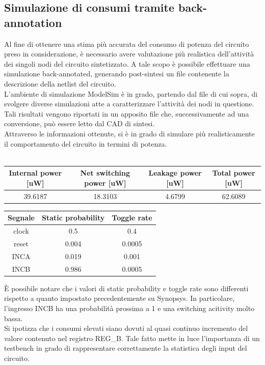 \documentclass[11pt,  english, makeidx, a4paper, titlepage, oneside]{book}
\begin{document}
\subsection{Simulazione di consumi tramite back-annotation}
Al fine di ottenere una stima più accurata del consumo di potenza del circuito preso in considerazione, è necessario avere valutazione più realistica dell'attività dei singoli nodi del circuito sintetizzato. A tale scopo è possibile effettuare una simulazione back-annotated, generando post-sintesi un file contenente la descrizione della netlist del circuito.
\\
L'ambiente di simulazione ModelSim è in grado, partendo dal file di cui sopra, di svolgere diverse simulazioni atte a caratterizzare l'attività dei nodi in questione. Tali risultati vengono riportati in un apposito file che, successivamente ad una conversione, può essere letto dal CAD di sintesi.
\\
Attraverso le informazioni ottenute, si è in grado di simulare più realisticamente il comportamento del circuito in termini di potenza.
\\\\
\begin{center}
	\begin{tabular}{|c|c|c|c|}
	\hline
	Internal power [uW] & Net switching power [uW] & Leakage power [uW] & Total power [uW] \\
	\hline
	 39.6187 & 18.3103  & 4.6799  &  62.6089 \\
	\hline
	\end{tabular}	
\end{center}
\vspace{0.3cm}
\begin{center}
	\begin{tabular}{|c|c|c|}
	\hline
Segnale & Static probability & Toggle rate \\
	\hline
	 clock & 0.5  &  0.4 \\
	\hline
	 reset & 0.004  &  0.0005 \\
	\hline
	 INCA & 0.019  &  0.001 \\
	\hline
	 INCB & 0.986  &  0.0005 \\
	\hline
	\end{tabular}	
\end{center}
\vspace{0.3cm}
È possibile notare che i valori di static probability e toggle rate sono differenti rispetto a quanto impostato precedentemente su Synopsys. In particolare, l'ingresso INCB ha una probabilità prossima a 1 e una switching acitivity molto bassa.
\\
Si ipotizza che i consumi elevati siano dovuti al quasi continuo incremento del valore contenuto nel registro REG\_B. Tale fatto mette in luce l'importanza di un testbench in grado di rappresentare correttamente la statistica  degli input del circuito.
\newpage
\end{document}
